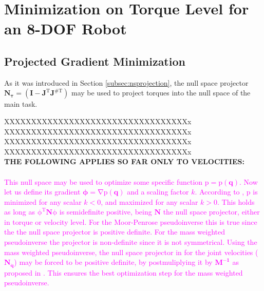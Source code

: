 \chapter{Minimization on Torque Level for an 8-DOF Robot}
\label{ch:control}





\section{Projected Gradient Minimization}
\label{sec:Gradientbasedminimization}

As it was introduced in Section \ref{subsec:nsprojection}, the null space projector $\mathrm{\mathbf{N_{\tau}}} = \mathrm{(\mathbf{I} - \mathbf{J}^T \mathbf{J}^{\#T})}$ may be used to project torques into the null space of the main task. 
 
 
 
 
 
 XXXXXXXXXXXXXXXXXXXXXXXXXXXXXXXXXXx \\
  XXXXXXXXXXXXXXXXXXXXXXXXXXXXXXXXXXx \\
   XXXXXXXXXXXXXXXXXXXXXXXXXXXXXXXXXXx \\
    XXXXXXXXXXXXXXXXXXXXXXXXXXXXXXXXXXx \\
 
\textbf{ THE FOLLOWING APPLIES SO FAR ONLY TO VELOCITIES:} \\
 \\
%
\textcolor{magenta}{ This null space may be used to optimize some specific function $\mathrm{{p}={p}(\mathbf{q})}$. Now let us define its gradient $ \mathrm{\mathbf{\phi} =  \nabla {p}(\mathbf{q})}$ and a scaling factor  $k$. According to \cite{yoshikawa}, $\mathrm{p}$ is minimized for any scalar $k < 0$, and maximized for any scalar $k > 0$. This holds	as long as $\mathrm{\phi^{T} \mathbf{N} \phi}$ is semidefinite positive, being $\mathrm{\mathbf{N}}$ the null space projector, either in torque or velocity level. For the Moor-Penrose pseudoinverse this is true since the the null space projector is positive definite. For the mass weighted pseudoinverse the projector is non-definite since it is not symmetrical. Using the mass weighted pseudoinverse, the null space projector in for the joint velocities ($\mathrm{\mathbf{N_{\dot{q}}}}$) may be forced to be positive definite, by postmuliplying it by $\mathrm{\mathbf{M^{-1}}}$ as proposed in \cite{Nemec}. This ensures the best optimization step for the mass weighted pseudoinverse.} \\
 
